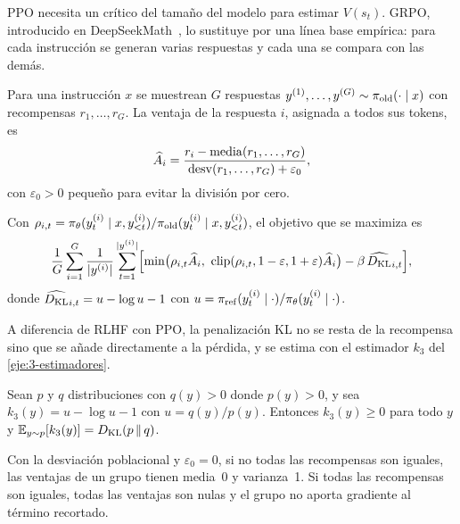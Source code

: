 PPO necesita un crítico del tamaño del modelo para estimar $V(s_t)$. GRPO, introducido en DeepSeekMath~\cite[§4.1]{deepseekmath}, lo sustituye por una línea base empírica: para cada instrucción se generan varias respuestas y cada una se compara con las demás.

\begin{definicion}\label{def:grpo-ventaja}
Para una instrucción $x$ se muestrean $G$ respuestas $y^{(1)},\dots,y^{(G)}\sim\pi_{\mathrm{old}}(\cdot\mid x)$ con recompensas $r_1,\dots,r_G$. La ventaja de la respuesta $i$, asignada a todos sus tokens, es
\[
\widehat A_i=\frac{r_i-\operatorname{media}(r_1,\dots,r_G)}{\operatorname{desv}(r_1,\dots,r_G)+\varepsilon_0},
\]
con $\varepsilon_0>0$ pequeño para evitar la división por cero.
\end{definicion}

\begin{definicion}\label{def:grpo}
Con $\rho_{i,t}=\pi_\theta(y^{(i)}_t\mid x,y^{(i)}_{<t})/\pi_{\mathrm{old}}(y^{(i)}_t\mid x,y^{(i)}_{<t})$, el objetivo que se maximiza es~\cite[ec.~(3)]{deepseekmath}
\[
\frac1G\sum_{i=1}^{G}\frac{1}{\lvert y^{(i)}\rvert}\sum_{t=1}^{\lvert y^{(i)}\rvert}\Bigl[\min\bigl(\rho_{i,t}\widehat A_i,\ \operatorname{clip}(\rho_{i,t},1-\varepsilon,1+\varepsilon)\widehat A_i\bigr)-\beta\,\widehat{D_{\mathrm{KL}}}_{i,t}\Bigr],
\]
donde $\widehat{D_{\mathrm{KL}}}_{i,t}=u-\log u-1$ con $u=\pi_{\mathrm{ref}}(y^{(i)}_t\mid\cdot)/\pi_\theta(y^{(i)}_t\mid\cdot)$.
\end{definicion}

A diferencia de RLHF con PPO, la penalización KL no se resta de la recompensa sino que se añade directamente a la pérdida, y se estima con el estimador $k_3$ del \cref{eje:3-estimadores}.

\begin{proposicion}\label{prop:k3}
Sean $p$ y $q$ distribuciones con $q(y)>0$ donde $p(y)>0$, y sea $k_3(y)=u-\log u-1$ con $u=q(y)/p(y)$. Entonces $k_3(y)\ge 0$ para todo $y$ y $\mathbb{E}_{y\sim p}[k_3(y)]=D_{\mathrm{KL}}(p\,\|\,q)$.
\end{proposicion}

\begin{proposicion}\label{prop:grpo}
Con la desviación poblacional y $\varepsilon_0=0$, si no todas las recompensas son iguales, las ventajas de un grupo tienen media~0 y varianza~1. Si todas las recompensas son iguales, todas las ventajas son nulas y el grupo no aporta gradiente al término recortado.
\end{proposicion}

